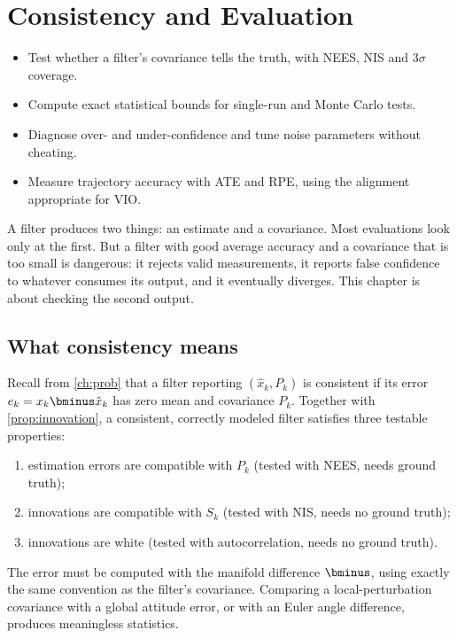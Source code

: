 \chapter{Consistency and Evaluation}
\label{ch:consistency}

\begin{objectives}
\begin{itemize}
  \item Test whether a filter's covariance tells the truth, with NEES, NIS and $3\sigma$ coverage.
  \item Compute exact statistical bounds for single-run and Monte Carlo tests.
  \item Diagnose over- and under-confidence and tune noise parameters without cheating.
  \item Measure trajectory accuracy with ATE and RPE, using the alignment appropriate for VIO.
\end{itemize}
\end{objectives}

A filter produces two things: an estimate and a covariance. Most evaluations look only at the first. But a
filter with good average accuracy and a covariance that is too small is dangerous: it rejects valid measurements,
it reports false confidence to whatever consumes its output, and it eventually diverges. This chapter is about
checking the second output.

\section{What consistency means}

Recall from \cref{ch:prob} that a filter reporting $(\hat x_k, P_k)$ is consistent if its error $e_k = x_k\bminus\hat x_k$ has
zero mean and covariance $P_k$. Together with \cref{prop:innovation}, a consistent, correctly modeled filter
satisfies three testable properties:
\begin{enumerate}
  \item estimation errors are compatible with $P_k$ (tested with NEES, needs ground truth);
  \item innovations are compatible with $S_k$ (tested with NIS, needs no ground truth);
  \item innovations are white (tested with autocorrelation, needs no ground truth).
\end{enumerate}
The error must be computed with the manifold difference $\bminus$, using exactly the same convention as the
filter's covariance. Comparing a local-perturbation covariance with a global attitude error, or with an Euler
angle difference, produces meaningless statistics.

